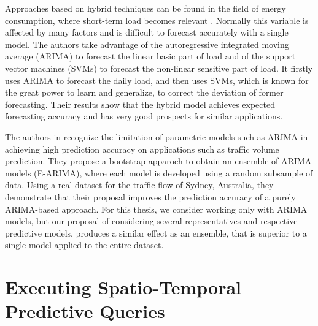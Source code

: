 Approaches based on hybrid techniques can be found in the field of energy consumption, where short-term  load becomes relevant \cite{Nie2012}. Normally this variable is affected by many factors and is difficult to forecast accurately with a single model. The authors take advantage of the autoregressive integrated moving average (ARIMA) to forecast the linear basic part of load and of the support vector machines (SVMs) to forecast the non-linear sensitive part of load. It firstly uses ARIMA to forecast the daily load, and then uses SVMs,  which  is  known  for  the  great  power  to  learn  and  generalize,  to  correct  the  deviation  of  former  forecasting. Their results show that the hybrid model achieves expected forecasting  accuracy and has very good prospects for similar applications.

The authors in \cite{Shahriari2020} recognize the limitation of parametric models such as ARIMA in achieving high prediction accuracy on applications such as traffic volume prediction. They propose a bootstrap apparoch to obtain an ensemble of ARIMA models (E-ARIMA), where each model is developed using a random subsample of data. Using a real dataset for the traffic flow of Sydney, Australia, they demonstrate that their proposal improves the prediction accuracy of a purely ARIMA-based approach. For this thesis, we consider working only with ARIMA models, but our proposal of considering several representatives and respective predictive models, produces a similar effect as an ensemble, that is superior to a single model applied to the entire dataset.




\section{Executing Spatio-Temporal Predictive Queries}
\label{Sec:RelatedWorksQueries}

